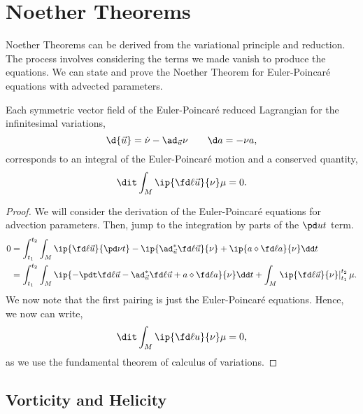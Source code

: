 \section{Noether Theorems}
Noether Theorems can be derived from the variational principle and reduction. The process involves considering the terms we made vanish to produce the equations. We can state and prove the Noether Theorem for Euler-Poincar\'e equations with advected parameters.
\begin{nthm}
  Each symmetric vector field of the Euler-Poincar\'e reduced Lagrangian for the infinitesimal variations,
  $$ \d {\vec u} = \dot \nu - \ad_{\vec u} \nu \qquad \d a = -\nu a, $$
  corresponds to an integral of the Euler-Poincar\'e motion and a conserved quantity,
  $$ \dit \int_{M} \ip{\fd \ell {\vec u}}{\nu}\mu = 0. $$
  \label{thm:n_ep_ap}
\end{nthm}
\begin{proof}
  We will consider the derivation of the Euler-Poincar\'e equations for advection parameters. Then, jump to the integration by parts of the $\pd u t$ term.
  \begin{align*}
    0 &= \int_{t_1}^{t_2} \int_M \ip{\fd \ell {\vec u}}{\pd \nu t} - \ip{\ad^*_{\vec u} \fd \ell {\vec u}}{\nu} + \ip{a \diamond \fd \ell a}{\nu} \dd t \\
    &= \int_{t_1}^{t_2} \int_M \ip{-\pdt\fd \ell {\vec u} - \ad^*_{\vec u} \fd \ell {\vec u} + a \diamond \fd \ell a}{\nu} \dd t + \int_M\left. \ip{\fd \ell {\vec u}}{\nu}\right|_{t_1}^{t_2} \mu.
  \end{align*}
  We now note that the first pairing is just the Euler-Poincar\'e equations. Hence, we now can write,
  $$ \dit \int_M \ip{\fd \ell u}{\nu} \mu = 0,$$
  as we use the fundamental theorem of calculus of variations.
\end{proof}

\subsection{Vorticity and Helicity}

